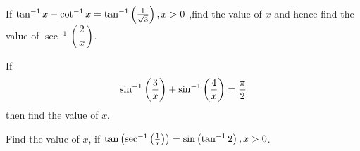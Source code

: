 \item If $\tan^{-1}x-\cot^{-1}x =\tan^{-1}\left(\frac{1}{ \sqrt3}\right), x>0$ ,find the value of $x$ and hence find the value of $\sec^{-1}\left(\dfrac{2}{x}\right)$.

\item  If
\begin{align*}
 \sin^{-1} \left(\dfrac{3}{x}\right) + \sin^{-1}\left(\dfrac{4}{x}\right)=\dfrac{\pi}{2} 
\end{align*}
then find the value of $x$. 

\item Find the value of $x$, if $\tan \left(\sec^{-1}\left(\frac{1}{x}\right)\right) = \sin \left(\tan^{-1}{2}\right),x > 0$.
